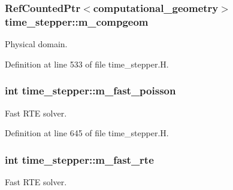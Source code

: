 \subsubsection[{\texorpdfstring{m\+\_\+compgeom}{m_compgeom}}]{\setlength{\rightskip}{0pt plus 5cm}Ref\+Counted\+Ptr$<${\bf computational\+\_\+geometry}$>$ time\+\_\+stepper\+::m\+\_\+compgeom\hspace{0.3cm}{\ttfamily [protected]}}\hypertarget{classtime__stepper_a3d0709bd478ebd891e89894c55c5253f}{}\label{classtime__stepper_a3d0709bd478ebd891e89894c55c5253f}


Physical domain. 



Definition at line 533 of file time\+\_\+stepper.\+H.

\subsubsection[{\texorpdfstring{m\+\_\+fast\+\_\+poisson}{m_fast_poisson}}]{\setlength{\rightskip}{0pt plus 5cm}int time\+\_\+stepper\+::m\+\_\+fast\+\_\+poisson\hspace{0.3cm}{\ttfamily [protected]}}\hypertarget{classtime__stepper_a8b9bbcec948740cc5de4fd749f7b1aca}{}\label{classtime__stepper_a8b9bbcec948740cc5de4fd749f7b1aca}


Fast R\+TE solver. 



Definition at line 645 of file time\+\_\+stepper.\+H.

\subsubsection[{\texorpdfstring{m\+\_\+fast\+\_\+rte}{m_fast_rte}}]{\setlength{\rightskip}{0pt plus 5cm}int time\+\_\+stepper\+::m\+\_\+fast\+\_\+rte\hspace{0.3cm}{\ttfamily [protected]}}\hypertarget{classtime__stepper_ae6674f68d4df3b6b1d1f4700893d63e6}{}\label{classtime__stepper_ae6674f68d4df3b6b1d1f4700893d63e6}


Fast R\+TE solver. 



